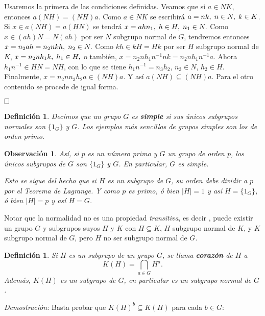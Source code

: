 \documentclass[12pt]{article}
\newtheorem{definition}[theorem]{Definición}
\newtheorem{observation}{Observación}[theorem]
\begin{document}
Usaremos la primera de las condiciones definidas. Veamos que si $a \in NK$, entonces $a(NH) = (NH)a$. Como $a \in NK$ se escribirá $a = nk, \hspace{0.1cm} n \in N, \hspace{0.1cm} k \in K$. Si $x \in a(NH) = a(HN)$ se tendrá $x = ahn_{1}, \hspace{0.1cm} h \in H, \hspace{0.1cm} n_{1} \in N.$ Como $x \in (ah)N = N(ah)$ por ser $N$ subgrupo normal de $G$, tendremos entonces $x = n_{2}ah = n_{2}nkh, \hspace{0.1cm} n_{2} \in N.$ Como $kh \in kH = Hk$ por ser $H$ subgrupo normal de $K$, $x = n_{2}nh_{1}k, \hspace{0.1cm} h_{1} \in H,$ o también, $x = n_{2}nh_{1}n^{-1}nk = n_{2}nh_{1}n^{-1}a$. Ahora $h_{1}n^{-1} \in HN = NH$, con lo que se tiene $h_{1}n^{-1} = n_{3}h_{2}$, $n_{3} \in N$, $h_{2} \in H$. Finalmente, $x = n_{2}nn_{3}h_{2}a \in (NH)a$. Y así $a(NH) \subseteq (NH)a$. Para el otro contenido se procede de igual forma.

$\hfill \square$

\begin{definition}Decimos que un grupo $G$ es \textbf{simple} si sus únicos subgrupos normales son $\lbrace 1_{G}\rbrace$ y $G$. Los ejemplos más sencillos de grupos simples son los de orden primo.
\end{definition}

\begin{observation}Así, si $p$ es un número primo y $G$ un grupo de orden $p$, los únicos subgrupos de $G$ son $\lbrace 1_{G}\rbrace$ y $G$. En particular, $G$ es simple.

Esto se sigue del hecho que si $H$ es un subgrupo de $G$, su orden debe dividir a $p$ por el \textit{Teorema de Lagrange}. Y como $p$ es primo, ó bien $|H| = 1$ y así $H = \lbrace 1_{G}\rbrace$, ó bien $|H| = p$ y así $H = G$.
\end{observation}

Notar que la normalidad no es una propiedad \textit{transitiva}, es decir , puede existir un grupo $G$ y subgrupos suyos $H$ y $K$ con $H \subseteq K$, $H$ subgrupo normal de $K$, y $K$ subgrupo normal de $G$, pero $H$ no ser subgrupo normal de $G$.

\begin{definition}Si $H$ es un subgrupo de un grupo $G$, se llama \textbf{corazón} de $H$ a $$K(H) = \bigcap_{a \in G} H^{a}. \label{eq:corazon}$$ Además, $K(H)$ es un subgrupo de $G$, en particular es un subgrupo normal de $G$.
\end{definition}
\emph{Demostración: }Basta probar que $K(H)^{b} \subseteq K(H)$ para cada $b \in G$:
\end{document}
